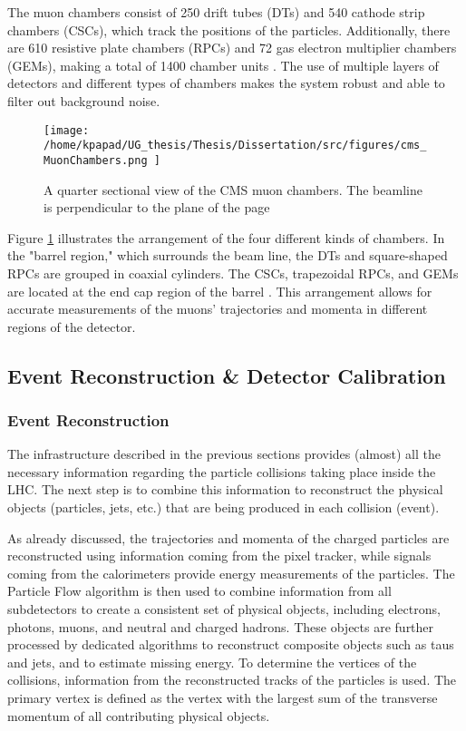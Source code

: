 The muon chambers consist of 250 drift tubes (DTs) and 540 cathode strip chambers (CSCs), which track the positions of the particles. Additionally, there are 610 resistive plate chambers (RPCs) and 72 gas electron multiplier chambers (GEMs), making a total of 1400 chamber units . The use of multiple layers of detectors and different types of chambers makes the system robust and able to filter out background noise.

\begin{figure}[ht]
\centering
\texttt{[image: /home/kpapad/UG\_thesis/Thesis/Dissertation/src/figures/cms\_MuonChambers.png ]}
\caption{A quarter sectional view of the CMS muon chambers. The beamline is perpendicular to the plane of the page}
\label{fig:muon_chambers}
\end{figure}

Figure \ref{fig:muon_chambers} illustrates the arrangement of the four different kinds of chambers. In the "barrel region," which surrounds the beam line, the DTs and square-shaped RPCs are grouped in coaxial cylinders. The CSCs, trapezoidal RPCs, and GEMs are located at the end cap region of the barrel . This arrangement allows for accurate measurements of the muons' trajectories and momenta in different regions of the detector.\cite{CMSDetectingMuons}
\subsection{Event Reconstruction \& Detector Calibration}
\label{sec:org3fecb86}
\subsubsection{Event Reconstruction}
\label{sec:orgfae79d0}
The infrastructure described in the previous sections provides (almost) all the necessary information regarding the particle collisions taking place inside the LHC. The next step is to combine this information to reconstruct the physical objects (particles, jets, etc.) that are being produced in each collision (event).

As already discussed, the trajectories and momenta of the charged particles are reconstructed using information coming from the pixel tracker, while signals coming from the calorimeters provide energy measurements of the particles. The Particle Flow algorithm is then used to combine information from all subdetectors to create a consistent set of physical objects, including electrons, photons, muons, and neutral and charged hadrons. These objects are further processed by dedicated algorithms to reconstruct composite objects such as taus and jets, and to estimate missing energy. To determine the vertices of the collisions, information from the reconstructed tracks of the particles is used. The primary vertex is defined as the vertex with the largest sum of the transverse momentum of all contributing physical objects.

